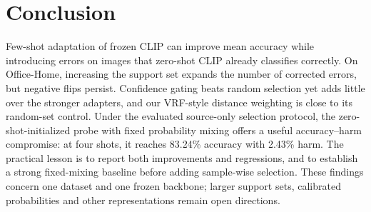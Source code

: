\section{Conclusion}
Few-shot adaptation of frozen CLIP can improve mean accuracy while introducing errors on images that zero-shot CLIP already classifies correctly. On Office-Home, increasing the support set expands the number of corrected errors, but negative flips persist. Confidence gating beats random selection yet adds little over the stronger adapters, and our VRF-style distance weighting is close to its random-set control. Under the evaluated source-only selection protocol, the zero-shot-initialized probe with fixed probability mixing offers a useful accuracy--harm compromise: at four shots, it reaches 83.24\% accuracy with 2.43\% harm. The practical lesson is to report both improvements and regressions, and to establish a strong fixed-mixing baseline before adding sample-wise selection. These findings concern one dataset and one frozen backbone; larger support sets, calibrated probabilities and other representations remain open directions.
